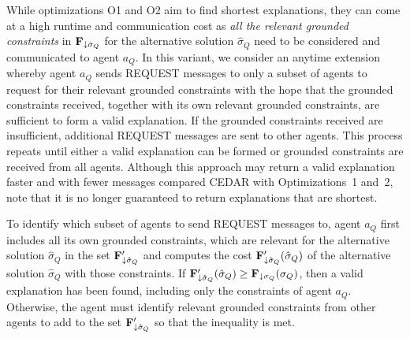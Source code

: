 \documentclass[twoside,11pt]{article}
\begin{document}

 While optimizations O1 and O2 aim to find shortest explanations, they can come at a high runtime and communication cost as \emph{all the relevant grounded constraints} in ${\bf{F}}_{\downarrow \hat{\sigma}_Q}$ for the alternative solution $\hat{\sigma}_Q$ need to be considered and communicated to agent $a_Q$. In this variant, we consider an anytime extension whereby agent $a_Q$ sends REQUEST messages to only a subset of agents to request for their relevant grounded constraints with the hope that the grounded constraints received, together with its own relevant grounded constraints, are sufficient to form a valid explanation. If the grounded constraints received are insufficient, additional REQUEST messages are sent to other agents. This process repeats until either a valid explanation can be formed or grounded constraints are received from all agents. Although this approach may return a valid explanation faster and with fewer messages compared CEDAR with Optimizations~1 and~2, note that it is no longer guaranteed to return explanations that are shortest.%

To identify which subset of agents to send REQUEST messages to, agent $a_Q$ first includes all its own grounded constraints, which are relevant for the alternative solution $\hat{\sigma}_Q$ in the set ${\bf{F}}'_{\downarrow \hat{\sigma}_Q}$ and computes the cost ${\bf{F}}'_{\downarrow \hat{\sigma}_Q}(\hat{\sigma}_Q)$ of the alternative solution $\hat{\sigma}_Q$ with those constraints. If ${\bf{F}}'_{\downarrow \hat{\sigma}_Q}(\hat{\sigma}_Q) \geq {\bf{F}}_{\downarrow \sigma_Q}(\sigma_Q)$, then a valid explanation has been found, including only the constraints of agent $a_Q$. Otherwise, the agent must identify relevant grounded constraints from other agents to add to the set ${\bf{F}}'_{\downarrow \hat{\sigma}_Q}$ so that the inequality is met. 
\end{document}
